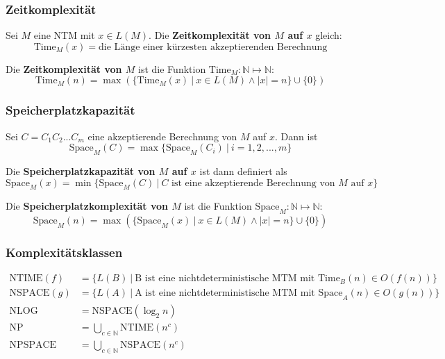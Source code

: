 \documentclass[11pt]{article}
\newcommand{\ttc}{\text{Time}}
\newcommand{\tsc}{\text{Space}}
\begin{document}
\subsubsection{Zeitkomplexität}

Sei $M$ eine NTM mit $x \in L(M)$. Die \textbf{Zeitkomplexität von $M$ auf $x$} gleich:
\begin{equation*}
	\ttc_M(x) = \text{die Länge einer kürzesten akzeptierenden Berechnung}
\end{equation*}

Die \textbf{Zeitkomplexität von $M$} ist die Funktion $\ttc_M: \mathbb{N} \mapsto \mathbb{N}$:
\begin{equation*}
	\ttc_M(n) = \max(\{\ttc_M(x)\ |\ x \in L(M) \land |x| = n\} \cup \{0\})
\end{equation*}

\subsubsection{Speicherplatzkapazität}

Sei $C = C_1C_2...C_m$ eine akzeptierende Berechnung von $M$ auf $x$. Dann ist
\begin{equation*}
	\tsc_M(C) = \max\{\tsc_M(C_i)\ |\ i=1,2,...,m\}
\end{equation*}

Die \textbf{Speicherplatzkapazität von $M$ auf $x$} ist dann definiert als
\begin{equation*}
	\tsc_M(x) = \min\{\tsc_M(C)\ |\ \text{$C$ ist eine akzeptierende Berechnung von $M$ auf $x$}\}
\end{equation*}

Die \textbf{Speicherplatzkomplexität von $M$} ist die Funktion $\tsc_M: \mathbb{N} \mapsto \mathbb{N}$:
\begin{equation*}
	\tsc_M(n) = \max(\{ \tsc_M(x)\ |\ x \in L(M) \land |x| = n\} \cup \{0\})
\end{equation*}

\subsubsection{Komplexitätsklassen}

\begin{equation*}
\begin{split}
	\text{NTIME}(f) & = \{L(B)\ |\ \text{B ist eine nichtdeterministische MTM mit } \ttc_B(n) \in O(f(n))\} \\
	\text{NSPACE}(g) & = \{L(A)\ |\ \text{A ist eine nichtdeterministische MTM mit } \tsc_A(n) \in O(g(n))\} \\
	\text{NLOG} & = \text{NSPACE}(\log_2 n) \\
	\text{NP} & = \bigcup_{c \in \mathbb{N}} \text{NTIME}(n^c) \\
	\text{NPSPACE} & = \bigcup_{c \in \mathbb{N}} \text{NSPACE}(n^c) \\
\end{split}
\end{equation*}
\end{document}
